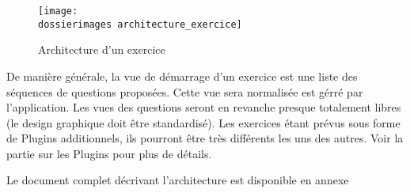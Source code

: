 \begin{figure}[htp]
	\centering
	\texttt{[image: \\dossierimages architecture\_exercice]}
	\caption{Architecture d'un exercice}
	\label{architecture_exercice}
\end{figure}

De manière générale, la vue de démarrage d’un exercice est une liste des séquences de questions proposées. Cette vue sera normalisée est gérré par l'application. Les vues des questions seront en revanche presque totalement libres (le design graphique doit être standardisé). Les exercices étant prévus sous forme de \og{}Plugins\fg{} additionnels, ils pourront \^{e}tre très différents les uns des autres. Voir la partie sur les Plugins %
pour plus de détails.

Le document complet décrivant l'architecture est disponible en annexe %